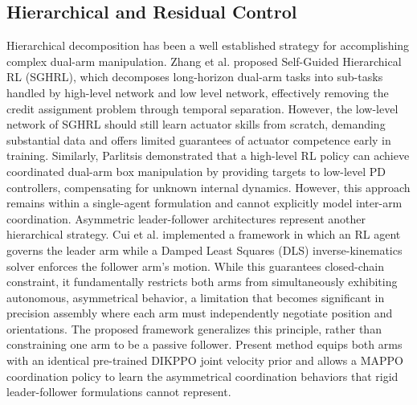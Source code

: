 \documentclass[a4paper,fleqn]{cas-dc}
\begin{document}
\subsection{Hierarchical and Residual Control}
Hierarchical decomposition has been a well established strategy for accomplishing complex dual-arm manipulation. Zhang et al. \cite{related-37} proposed Self-Guided Hierarchical RL (SGHRL), which decomposes long-horizon dual-arm tasks into sub-tasks handled by high-level network and low level network, effectively removing the credit assignment problem through temporal separation. However, the low-level network of SGHRL should still learn actuator skills from scratch, demanding substantial data and offers limited guarantees of actuator competence early in training. Similarly, Parlitsis \cite{related-38} demonstrated that a high-level RL policy can achieve coordinated dual-arm box manipulation by providing targets to low-level PD controllers, compensating for unknown internal dynamics. However, this approach remains within a single-agent formulation and cannot explicitly model inter-arm coordination. Asymmetric leader-follower architectures represent another hierarchical strategy. Cui et al. \cite{related-39} implemented a framework in which an RL agent governs the leader arm while a Damped Least Squares (DLS) inverse-kinematics solver enforces the follower arm's motion. While this guarantees closed-chain constraint, it fundamentally restricts both arms from simultaneously exhibiting autonomous, asymmetrical behavior, a limitation that becomes significant in precision assembly where each arm must independently negotiate position and orientations. The proposed framework generalizes this principle, rather than constraining one arm to be a passive follower. Present method equips both arms with an identical pre-trained DIKPPO joint velocity prior and allows a MAPPO coordination policy to learn the asymmetrical coordination behaviors that rigid leader-follower formulations cannot represent.
\end{document}
